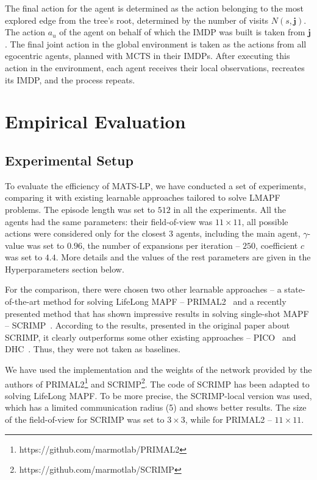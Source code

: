 \documentclass[letterpaper]{article} %
\begin{document}
The final action for the agent is determined as the action belonging to the most explored edge from the tree's root, determined by the number of visits \(N(s, \mathbf{j})\). The action \(a_u\) of the agent on behalf of which the IMDP was built is taken from \(\mathbf{j}\). The final joint action in the global environment is taken as the actions from all egocentric agents, planned with MCTS in their IMDPs. After executing this action in the environment, each agent receives their local observations, recreates its IMDP, and the process repeats.





\section{Empirical Evaluation}
\subsection{Experimental Setup}

To evaluate the efficiency of \textsc{MATS-LP}, we have conducted a set of experiments, comparing it with existing learnable approaches tailored to solve LMAPF problems. The episode length was set to $512$ in all the experiments. All the agents had the same parameters: their field-of-view was $11 \times 11$, all possible actions were considered only for the closest $3$ agents, including the main agent, $\gamma$-value was set to $0.96$, the number of expansions per iteration -- $250$, coefficient $c$ was set to $4.4$. More details and the values of the rest parameters are given in the Hyperparameters section below.

For the comparison, there were chosen two other learnable approaches -- a state-of-the-art method for solving LifeLong MAPF -- PRIMAL2~\cite{damani2021primal} and a recently presented method that has shown impressive results in solving single-shot MAPF -- SCRIMP~\cite{wang_scrimp_2023}. According to the results, presented in the original paper about SCRIMP, it clearly outperforms some other existing approaches -- PICO~\cite{Li2022MultiAgentPF} and DHC~\cite{ma2021distributed}. Thus, they were not taken as baselines.

We have used the implementation and the weights of the network provided by the authors of PRIMAL2\footnote{https://github.com/marmotlab/PRIMAL2} and SCRIMP\footnote{https://github.com/marmotlab/SCRIMP}. The code of SCRIMP has been adapted to solving LifeLong MAPF. To be more precise, the SCRIMP-local version was used, which has a limited communication radius (5) and shows better results. The size of the field-of-view for SCRIMP was set to $3\times3$, while for PRIMAL2 -- $11\times11$.
\end{document}
